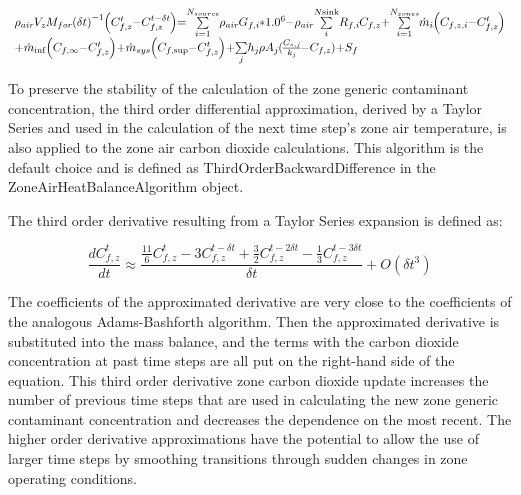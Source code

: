 \begin{equation}
\medmuskip=0mu
\thinmuskip=0mu
\thickmuskip=0mu
\nulldelimiterspace=0pt
\scriptspace=0pt
\begin{array}{l}{\rho_{air}}{V_z}{M_{for}}{\left( {\delta t} \right)^{ - 1}}\left( {C_{f,z}^t - C_{f,z}^{t - \delta t}} \right) = \sum\limits_{i = 1}^{{N_{source}}} {{\rho_{air}}{G_{f,i}}*{{1.0}^6} - } {\rho_{air}}\sum\limits_i^{N{\rm{sink}}} {{R_{f,i}}{C_{f,z}}}  + \sum\limits_{i = 1}^{{N_{zones}}} {{{\dot m}_i}} \left( {{C_{f,z,i}} - C_{f,z}^t} \right)\;\\\;\;\;\;\;\;\;\;\;\;\;\;\;\;\;\; + {{\dot m}_{\inf }}\left( {{C_{f,\infty }} - C_{f,z}^t} \right) + {{\dot m}_{sys}}\left( {{C_{f,\sup }} - C_{f,z}^t} \right) + \sum\limits_j {{h_j}\rho {A_j}(\frac{{{C_{s,j}}}}{{{k_j}}} - {C_{f,z}})}  + {S_f}\end{array}
\end{equation}

To preserve the stability of the calculation of the zone generic contaminant concentration, the third order differential approximation, derived by a Taylor Series and used in the calculation of the next time step's zone air temperature, is also applied to the zone air carbon dioxide calculations. This algorithm is the default choice and is defined as ThirdOrderBackwardDifference in the ZoneAirHeatBalanceAlgorithm object.

The third order derivative resulting from a Taylor Series expansion is defined as:

\begin{equation}
\frac{{dC_{f,z}^t}}{{dt}} \approx \frac{{\frac{{11}}{6}C_{f,z}^t - 3C_{f,z}^{t - \delta t} + \frac{3}{2}C_{f,z}^{t - 2\delta t} - \frac{1}{3}C_{f,z}^{t - 3\delta t}}}{{\delta t}} + O(\delta {t^3})
\end{equation}

The coefficients of the approximated derivative are very close to the coefficients of the analogous Adams-Bashforth algorithm. Then the approximated derivative is substituted into the mass balance, and the terms with the carbon dioxide concentration at past time steps are all put on the right-hand side of the equation. This third order derivative zone carbon dioxide update increases the number of previous time steps that are used in calculating the new zone generic contaminant concentration and decreases the dependence on the most recent. The higher order derivative approximations have the potential to allow the use of larger time steps by smoothing transitions through sudden changes in zone operating conditions.

